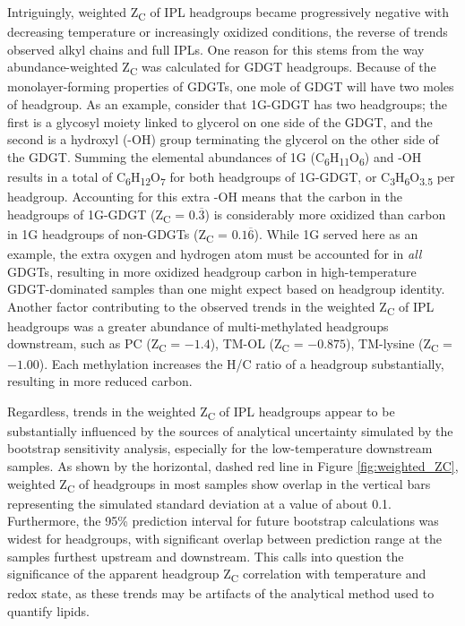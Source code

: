 Intriguingly, weighted Z\textsubscript{C} of IPL headgroups became progressively negative with decreasing temperature or increasingly oxidized conditions, the reverse of trends observed alkyl chains and full IPLs. One reason for this stems from the way abundance-weighted Z\textsubscript{C} was calculated for GDGT headgroups. Because of the monolayer-forming properties of GDGTs, one mole of GDGT will have two moles of headgroup. As an example, consider that 1G-GDGT has two headgroups; the first is a glycosyl moiety linked to glycerol on one side of the GDGT, and the second is a hydroxyl (-OH) group terminating the glycerol on the other side of the GDGT. Summing the elemental abundances of 1G (C\textsubscript{6}H\textsubscript{11}O\textsubscript{6}) and -OH results in a total of C\textsubscript{6}H\textsubscript{12}O\textsubscript{7} for both headgroups of 1G-GDGT, or C\textsubscript{3}H\textsubscript{6}O\textsubscript{3.5} per headgroup. Accounting for this extra -OH means that the carbon in the headgroups of 1G-GDGT (Z\textsubscript{C} = $0.\overline{3}$) is considerably more oxidized than carbon in 1G headgroups of non-GDGTs (Z\textsubscript{C} = $0.1\overline{6}$). While 1G served here as an example, the extra oxygen and hydrogen atom must be accounted for in \textit{all} GDGTs, resulting in more oxidized headgroup carbon in high-temperature GDGT-dominated samples than one might expect based on headgroup identity. Another factor contributing to the observed trends in the weighted Z\textsubscript{C} of IPL headgroups was a greater abundance of multi-methylated headgroups downstream, such as PC (Z\textsubscript{C} = $-1.4$), TM-OL (Z\textsubscript{C} = $-0.875$), TM-lysine (Z\textsubscript{C} = $-1.00$). Each methylation increases the H/C ratio of a headgroup substantially, resulting in more reduced carbon.

Regardless, trends in the weighted Z\textsubscript{C} of IPL headgroups appear to be substantially influenced by the sources of analytical uncertainty simulated by the bootstrap sensitivity analysis, especially for the low-temperature downstream samples. As shown by the horizontal, dashed red line in Figure \ref{fig:weighted_ZC}, weighted Z\textsubscript{C} of headgroups in most samples show overlap in the vertical bars representing the simulated standard deviation at a value of about 0.1. Furthermore, the 95\% prediction interval for future bootstrap calculations was widest for headgroups, with significant overlap between prediction range at the samples furthest upstream and downstream. This calls into question the significance of the apparent headgroup Z\textsubscript{C} correlation with temperature and redox state, as these trends may be artifacts of the analytical method used to quantify lipids.



